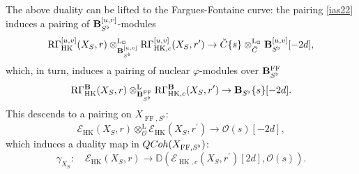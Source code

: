 \documentclass[10pt,reqno]{amsart}
\theoremstyle{definition}
\theoremstyle{remark}
\def\phi{\varphi}
\newcommand{\hk}{\operatorname{HK} }
\newcommand{\LL}{\operatorname{L} }
\newcommand{\FF}{\operatorname{FF} }
\newcommand{\so}{{\mathcal O}}
\newcommand{\se}{{\mathcal{E}}}
\numberwithin{equation}{section}
\def\R{{\mathrm R}}
\numberwithin{equation}{section}
\begin{document}
 The above duality can be lifted to the Fargues-Fontaine curve: the pairing \eqref{ias22} induces a pairing of ${{\bf B}_{S^{\flat}}^{[u,v]}}$-modules
 $$
 \R\Gamma^{{[u,v]}}_{\hk}(X_S,r)\otimes^{\LL_{\Box}}_{\B_{S^{\flat}}^{[u,v]}}\R\Gamma^{{[u,v]}}_{\hk,c}(X_S,r^{\prime})\to \breve{C}\{s\}\otimes_{\breve{C}}^{\LL_{\Box}}\B_{S^{\flat}}^{[u,v]}[-2d], 
 $$
 which, in turn, induces a pairing of nuclear $\phi$-modules over $\B^{\FF}_{S^{\flat}}$
 $$
  \R\Gamma^{\B}_{\hk}(X_S,r)\otimes^{\LL}_{\B^{\FF}_{S^{\flat}}}\R\Gamma^{\B}_{\hk,c}(X_S,r^{\prime})\to\B_{S^{\flat}}\{s\}[-2d].
 $$
This descends to a pairing on $X_{\FF,S^{\flat}}$:
 $$
 \se_{\hk}(X_S,r)\otimes^{\LL}_{\so}\se_{\hk}(X_S,r^{\prime})\to \so(s)[-2d],
 $$
 which induces a duality map in ${\rm QCoh}(X_{\FF,S^{\flat}})$: 
 \begin{equation}\label{niedziela11}
 \gamma_{X_S}:\quad  \se_{\hk}(X_S,r){\to} {\mathbb D}(\se_{\hk,c}(X_S,r^{\prime})[2d],\so(s)).
 \end{equation}

 
\end{document}
